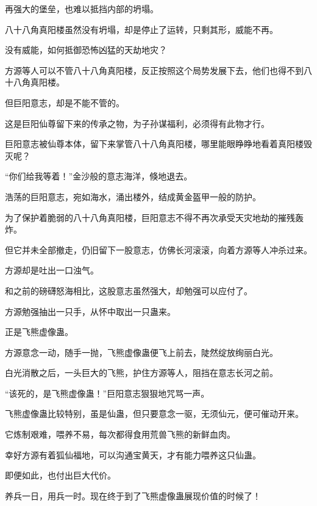 \begin{this_body}
再强大的堡垒，也难以抵挡内部的坍塌。

八十八角真阳楼虽然没有坍塌，却是停止了运转，只剩其形，威能不再。

没有威能，如何抵御恐怖凶猛的天劫地灾？

方源等人可以不管八十八角真阳楼，反正按照这个局势发展下去，他们也得不到八十八角真阳楼。

但巨阳意志，却是不能不管的。

这是巨阳仙尊留下来的传承之物，为子孙谋福利，必须得有此物才行。

巨阳意志被仙尊本体，留下来掌管八十八角真阳楼，哪里能眼睁睁地看着真阳楼毁灭呢？

“你们给我等着！”金沙般的意志海洋，倏地退去。

浩荡的巨阳意志，宛如海水，涌出楼外，结成黄金盔甲一般的防护。

为了保护着脆弱的八十八角真阳楼，巨阳意志不得不再次承受天灾地劫的摧残轰炸。

但它并未全部撤走，仍旧留下一股意志，仿佛长河滚滚，向着方源等人冲杀过来。

方源却是吐出一口浊气。

和之前的磅礴怒海相比，这股意志虽然强大，却勉强可以应付了。

方源勉强抽出一只手，从怀中取出一只蛊来。

正是飞熊虚像蛊。

方源意念一动，随手一抛，飞熊虚像蛊便飞上前去，陡然绽放绚丽白光。

白光消散之后，一头巨大的飞熊，护住方源等人，阻挡在意志长河之前。

“该死的，是飞熊虚像蛊！”巨阳意志狠狠地咒骂一声。

飞熊虚像蛊比较特别，虽是仙蛊，但只要意念一驱，无须仙元，便可催动开来。

它炼制艰难，喂养不易，每次都得食用荒兽飞熊的新鲜血肉。

幸好方源有着狐仙福地，可以沟通宝黄天，才有能力喂养这只仙蛊。

即便如此，也付出巨大代价。

养兵一日，用兵一时。现在终于到了飞熊虚像蛊展现价值的时候了！

\end{this_body}

